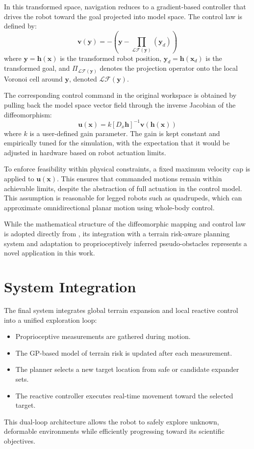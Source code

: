 In this transformed space, navigation reduces to a gradient-based controller that drives the robot toward the goal projected into model space. The control law is defined by:
\begin{equation}
\mathbf{v}(\mathbf{y}) = -\left(\mathbf{y} - \prod_{\mathcal{LF}(\mathbf{y})}(\mathbf{y}_d)\right)
\end{equation}
where \( \mathbf{y} = \mathbf{h}(\mathbf{x}) \) is the transformed robot position, \( \mathbf{y}_d = \mathbf{h}(\mathbf{x}_d) \) is the transformed goal, and \( \Pi_{\mathcal{LF}(\mathbf{y})} \) denotes the projection operator onto the local Voronoi cell around \( \mathbf{y} \), denoted \( \mathcal{LF}(\mathbf{y}) \).

The corresponding control command in the original workspace is obtained by pulling back the model space vector field through the inverse Jacobian of the diffeomorphism:
\begin{equation}
\mathbf{u}(\mathbf{x}) = k \left[ D_x \mathbf{h} \right]^{-1} \mathbf{v}(\mathbf{h}(\mathbf{x}))
\end{equation}
where \( k \) is a user-defined gain parameter. The gain is kept constant and empirically tuned for the simulation, with the expectation that it would be adjusted in hardware based on robot actuation limits.

To enforce feasibility within physical constraints, a fixed maximum velocity cap is applied to \( \mathbf{u}(\mathbf{x}) \). This ensures that commanded motions remain within achievable limits, despite the abstraction of full actuation in the control model. This assumption is reasonable for legged robots such as quadrupeds, which can approximate omnidirectional planar motion using whole-body control.

While the mathematical structure of the diffeomorphic mapping and control law is adopted directly from \textcite{vasilopoulos2021reactivenavigationpartiallyfamiliar}, its integration with a terrain risk-aware planning system and adaptation to proprioceptively inferred pseudo-obstacles represents a novel application in this work.

\section{System Integration}

The final system integrates global terrain expansion and local reactive control into a unified exploration loop:

\begin{itemize}
    \item Proprioceptive measurements are gathered during motion.
    \item The GP-based model of terrain risk is updated after each measurement.
    \item The planner selects a new target location from safe or candidate expander sets.
    \item The reactive controller executes real-time movement toward the selected target.
\end{itemize}

This dual-loop architecture allows the robot to safely explore unknown, deformable environments while efficiently progressing toward its scientific objectives.
